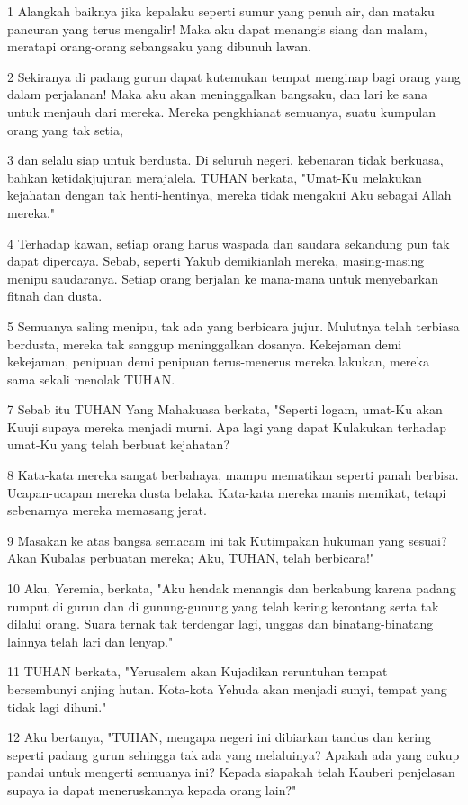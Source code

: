 \par 1 Alangkah baiknya jika kepalaku seperti sumur yang penuh air, dan mataku pancuran yang terus mengalir! Maka aku dapat menangis siang dan malam, meratapi orang-orang sebangsaku yang dibunuh lawan.
\par 2 Sekiranya di padang gurun dapat kutemukan tempat menginap bagi orang yang dalam perjalanan! Maka aku akan meninggalkan bangsaku, dan lari ke sana untuk menjauh dari mereka. Mereka pengkhianat semuanya, suatu kumpulan orang yang tak setia,
\par 3 dan selalu siap untuk berdusta. Di seluruh negeri, kebenaran tidak berkuasa, bahkan ketidakjujuran merajalela. TUHAN berkata, "Umat-Ku melakukan kejahatan dengan tak henti-hentinya, mereka tidak mengakui Aku sebagai Allah mereka."
\par 4 Terhadap kawan, setiap orang harus waspada dan saudara sekandung pun tak dapat dipercaya. Sebab, seperti Yakub demikianlah mereka, masing-masing menipu saudaranya. Setiap orang berjalan ke mana-mana untuk menyebarkan fitnah dan dusta.
\par 5 Semuanya saling menipu, tak ada yang berbicara jujur. Mulutnya telah terbiasa berdusta, mereka tak sanggup meninggalkan dosanya. Kekejaman demi kekejaman, penipuan demi penipuan terus-menerus mereka lakukan, mereka sama sekali menolak TUHAN.
\par 7 Sebab itu TUHAN Yang Mahakuasa berkata, "Seperti logam, umat-Ku akan Kuuji supaya mereka menjadi murni. Apa lagi yang dapat Kulakukan terhadap umat-Ku yang telah berbuat kejahatan?
\par 8 Kata-kata mereka sangat berbahaya, mampu mematikan seperti panah berbisa. Ucapan-ucapan mereka dusta belaka. Kata-kata mereka manis memikat, tetapi sebenarnya mereka memasang jerat.
\par 9 Masakan ke atas bangsa semacam ini tak Kutimpakan hukuman yang sesuai? Akan Kubalas perbuatan mereka; Aku, TUHAN, telah berbicara!"
\par 10 Aku, Yeremia, berkata, "Aku hendak menangis dan berkabung karena padang rumput di gurun dan di gunung-gunung yang telah kering kerontang serta tak dilalui orang. Suara ternak tak terdengar lagi, unggas dan binatang-binatang lainnya telah lari dan lenyap."
\par 11 TUHAN berkata, "Yerusalem akan Kujadikan reruntuhan tempat bersembunyi anjing hutan. Kota-kota Yehuda akan menjadi sunyi, tempat yang tidak lagi dihuni."
\par 12 Aku bertanya, "TUHAN, mengapa negeri ini dibiarkan tandus dan kering seperti padang gurun sehingga tak ada yang melaluinya? Apakah ada yang cukup pandai untuk mengerti semuanya ini? Kepada siapakah telah Kauberi penjelasan supaya ia dapat meneruskannya kepada orang lain?"
